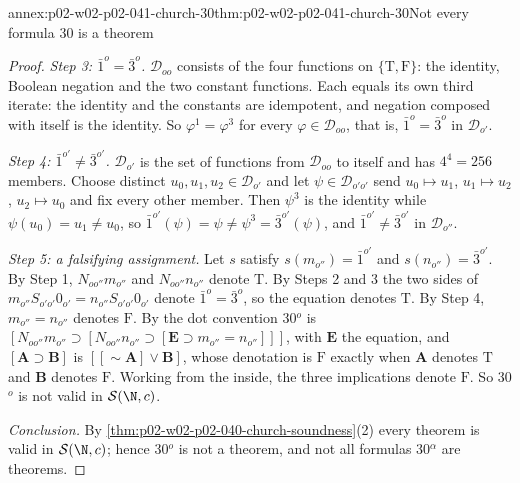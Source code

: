 \begin{annexitem}{annex:p02-w02-p02-041-church-30}{thm:p02-w02-p02-041-church-30}{Not every formula 30 is a theorem}
\begin{proof}
\emph{Step 3: \(\bar1^o=\bar3^o\).}  \(\mathcal D_{oo}\) consists of the four
functions on \(\{\mathrm T,\mathrm F\}\): the identity, Boolean negation and
the two constant functions.  Each equals its own third iterate: the identity
and the constants are idempotent, and negation composed with itself is the
identity.  So \(\varphi^1=\varphi^3\) for every \(\varphi\in\mathcal D_{oo}\),
that is, \(\bar1^o=\bar3^o\) in \(\mathcal D_{o'}\).

\emph{Step 4: \(\bar1^{o'}\ne\bar3^{o'}\).}  \(\mathcal D_{o'}\) is the set of
functions from \(\mathcal D_{oo}\) to itself and has \(4^4=256\) members.
Choose distinct \(u_0,u_1,u_2\in\mathcal D_{o'}\) and let \(\psi\in\mathcal
D_{o'o'}\) send \(u_0\mapsto u_1\), \(u_1\mapsto u_2\), \(u_2\mapsto u_0\) and
fix every other member.  Then \(\psi^3\) is the identity while
\(\psi(u_0)=u_1\ne u_0\), so
\(\bar1^{o'}(\psi)=\psi\ne\psi^3=\bar3^{o'}(\psi)\), and
\(\bar1^{o'}\ne\bar3^{o'}\) in \(\mathcal D_{o''}\).

\emph{Step 5: a falsifying assignment.}  Let \(s\) satisfy
\(s(m_{o''})=\bar1^{o'}\) and \(s(n_{o''})=\bar3^{o'}\).  By Step 1,
\(N_{oo''}m_{o''}\) and \(N_{oo''}n_{o''}\) denote \(\mathrm T\).  By Steps 2
and 3 the two sides of
\(m_{o''}S_{o'o'}0_{o'}=n_{o''}S_{o'o'}0_{o'}\) denote \(\bar1^o=\bar3^o\), so
the equation denotes \(\mathrm T\).  By Step 4,
\(m_{o''}=n_{o''}\) denotes \(\mathrm F\).  By the dot convention 30\(^o\) is
\([N_{oo''}m_{o''}\supset[N_{oo''}n_{o''}\supset[\mathbf E\supset
m_{o''}=n_{o''}]]]\), with \(\mathbf E\) the equation, and
\([\mathbf A\supset\mathbf B]\) is \([[\sim\mathbf A]\vee\mathbf B]\), whose
denotation is \(\mathrm F\) exactly when \(\mathbf A\) denotes \(\mathrm T\)
and \(\mathbf B\) denotes \(\mathrm F\).  Working from the inside, the three
implications denote \(\mathrm F\).  So 30\(^o\) is not valid in
\(\mathcal S(\N,c)\).

\emph{Conclusion.}  By \cref{thm:p02-w02-p02-040-church-soundness}(2) every
theorem is valid in \(\mathcal S(\N,c)\); hence 30\(^o\) is not a theorem,
and not all formulas 30\(^\alpha\) are theorems.
\end{proof}
\end{annexitem}
